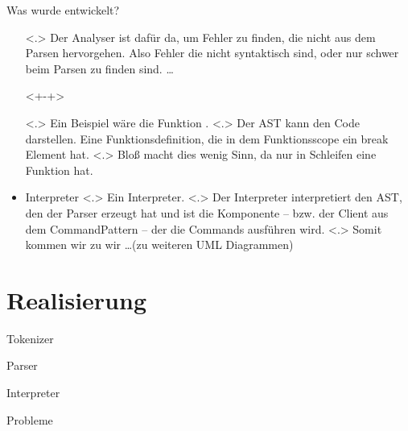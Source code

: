 \begin{frame}{Was wurde entwickelt?}
\begin{itemize}[<+- | alert@+>]
{            }
            \note[item]<.>{
              Der Analyser ist dafür da, um Fehler zu finden, die nicht aus dem Parsen hervorgehen. Also Fehler die nicht syntaktisch sind, oder nur schwer beim Parsen zu finden sind.
              \ldots
            }
        \begin{uncoverenv}<+-+>%
        \end{uncoverenv}
            \note[item]<.>{
              Ein Beispiel wäre die Funktion .
              }
            \note[item]<.>{
              Der AST kann den Code darstellen. Eine Funktionsdefinition, die in dem Funktionsscope ein break Element hat.
            }
            \note[item]<.>{
              Bloß macht dies wenig Sinn, da  nur in Schleifen eine Funktion hat.
            }
      \item
        Interpreter
            \note[item]<.>{
              Ein Interpreter.
            }
            \note[item]<.>{
              Der Interpreter interpretiert den AST, den der Parser erzeugt hat und ist die Komponente -- bzw. der Client aus dem CommandPattern -- der die Commands ausführen wird.
            }
            \note[item]<.>{
              Somit kommen wir zu wir \ldots (zu weiteren UML Diagrammen)
            }
    \end{itemize}
  \end{frame}

\section{Realisierung}
  \begin{frame}{Tokenizer}
  \end{frame}
  \begin{frame}{Parser} %
  \end{frame}
  \begin{frame}{Interpreter}
  \end{frame}
  \begin{frame}{Probleme} %
  \end{frame}

